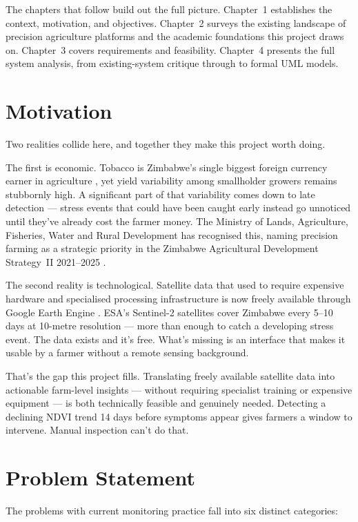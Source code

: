 \documentclass[12pt,a4paper]{report}
\begin{document}
The chapters that follow build out the full picture. Chapter~1 establishes the context, motivation, and objectives. Chapter~2 surveys the existing landscape of precision agriculture platforms and the academic foundations this project draws on. Chapter~3 covers requirements and feasibility. Chapter~4 presents the full system analysis, from existing-system critique through to formal UML models.

\section{Motivation}

Two realities collide here, and together they make this project worth doing.

The first is economic. Tobacco is Zimbabwe's single biggest foreign currency earner in agriculture \citep{timb2023}, yet yield variability among smallholder growers remains stubbornly high. A significant part of that variability comes down to late detection — stress events that could have been caught early instead go unnoticed until they've already cost the farmer money. The Ministry of Lands, Agriculture, Fisheries, Water and Rural Development has recognised this, naming precision farming as a strategic priority in the Zimbabwe Agricultural Development Strategy~II 2021--2025 \citep{moa2022}.

The second reality is technological. Satellite data that used to require expensive hardware and specialised processing infrastructure is now freely available through Google Earth Engine \citep{gorelick2017}. ESA's Sentinel-2 satellites cover Zimbabwe every 5--10 days at 10-metre resolution \citep{esa2023} — more than enough to catch a developing stress event. The data exists and it's free. What's missing is an interface that makes it usable by a farmer without a remote sensing background.

That's the gap this project fills. Translating freely available satellite data into actionable farm-level insights — without requiring specialist training or expensive equipment — is both technically feasible and genuinely needed. Detecting a declining NDVI trend 14 days before symptoms appear gives farmers a window to intervene. Manual inspection can't do that.

\section{Problem Statement}

The problems with current monitoring practice fall into six distinct categories:
\end{document}

